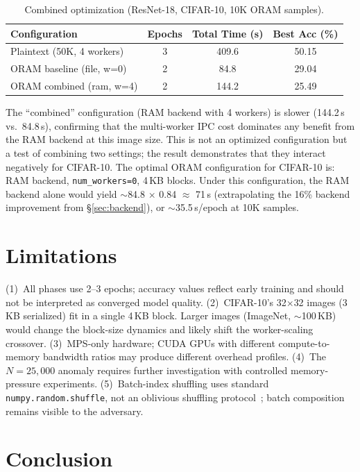 \documentclass[11pt]{article}
\begin{document}
\begin{table}[ht]
\centering
\caption{Combined optimization (ResNet-18, CIFAR-10, 10K ORAM samples).}
\label{tab:phase8}
\begin{tabular}{@{}lccc@{}}
\toprule
\textbf{Configuration} & \textbf{Epochs} & \textbf{Total Time (s)} & \textbf{Best Acc (\%)} \\
\midrule
Plaintext (50K, 4 workers)       & 3 & 409.6 & 50.15 \\
ORAM baseline (file, w=0)        & 2 & 84.8  & 29.04 \\
ORAM combined (ram, w=4)         & 2 & 144.2 & 25.49 \\
\bottomrule
\end{tabular}
\end{table}

The ``combined'' configuration (RAM backend with 4 workers) is slower (144.2\,s vs.\ 84.8\,s), confirming that the multi-worker IPC cost dominates any benefit from the RAM backend at this image size.
This is not an optimized configuration but a test of combining two settings; the result demonstrates that they interact negatively for CIFAR-10.
The optimal ORAM configuration for CIFAR-10 is: RAM backend, \texttt{num\_workers=0}, 4\,KB blocks.
Under this configuration, the RAM backend alone would yield $\sim$84.8 $\times$ 0.84 $\approx$ 71\,s (extrapolating the 16\% backend improvement from \S\ref{sec:backend}), or $\sim$35.5\,s/epoch at 10K samples.

\section{Limitations}
\label{sec:limitations}

(1)~All phases use 2--3 epochs; accuracy values reflect early training and should not be interpreted as converged model quality.
(2)~CIFAR-10's 32$\times$32 images (3\,KB serialized) fit in a single 4\,KB block. Larger images (ImageNet, $\sim$100\,KB) would change the block-size dynamics and likely shift the worker-scaling crossover.
(3)~MPS-only hardware; CUDA GPUs with different compute-to-memory bandwidth ratios may produce different overhead profiles.
(4)~The $N=25{,}000$ anomaly requires further investigation with controlled memory-pressure experiments.
(5)~Batch-index shuffling uses standard \texttt{numpy.random.shuffle}, not an oblivious shuffling protocol~\cite{ngai2024}; batch composition remains visible to the adversary.

\section{Conclusion}
\end{document}
